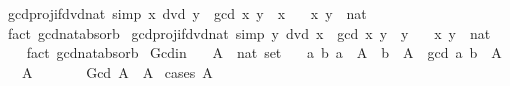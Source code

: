 \begin{isabellebody}
\isanewline
%
\endisadelimproof
\isanewline
{}\isamarkupfalse%
\ gcd{\isacharunderscore}{\kern0pt}proj{}{\isacharunderscore}{\kern0pt}if{\isacharunderscore}{\kern0pt}dvd{\isacharunderscore}{\kern0pt}nat\ {\isacharbrackleft}{\kern0pt}simp{\isacharbrackright}{\kern0pt}{\isacharcolon}{\kern0pt}\ {\isachardoublequoteopen}x\ dvd\ y\ {\isasymLongrightarrow}\ gcd\ x\ y\ {\isacharequal}{\kern0pt}\ x{\isachardoublequoteclose}\isanewline
\ \ \ x\ y\ {\isacharcolon}{\kern0pt}{\isacharcolon}{\kern0pt}\ nat\isanewline
%
\isadelimproof
\ \ %
\endisadelimproof
%
\isatagproof
{}\isamarkupfalse%
\ {\isacharparenleft}{\kern0pt}fact\ gcd{\isacharunderscore}{\kern0pt}nat{\isachardot}{\kern0pt}absorb{}{\isacharparenright}{\kern0pt}%
\endisatagproof
{\isafoldproof}%
%
\isadelimproof
\isanewline
%
\endisadelimproof
\isanewline
{}\isamarkupfalse%
\ gcd{\isacharunderscore}{\kern0pt}proj{}{\isacharunderscore}{\kern0pt}if{\isacharunderscore}{\kern0pt}dvd{\isacharunderscore}{\kern0pt}nat\ {\isacharbrackleft}{\kern0pt}simp{\isacharbrackright}{\kern0pt}{\isacharcolon}{\kern0pt}\ {\isachardoublequoteopen}y\ dvd\ x\ {\isasymLongrightarrow}\ gcd\ x\ y\ {\isacharequal}{\kern0pt}\ y{\isachardoublequoteclose}\isanewline
\ \ \ x\ y\ {\isacharcolon}{\kern0pt}{\isacharcolon}{\kern0pt}\ nat\isanewline
%
\isadelimproof
\ \ %
\endisadelimproof
%
\isatagproof
{}\isamarkupfalse%
\ {\isacharparenleft}{\kern0pt}fact\ gcd{\isacharunderscore}{\kern0pt}nat{\isachardot}{\kern0pt}absorb{}{\isacharparenright}{\kern0pt}%
\endisatagproof
{\isafoldproof}%
%
\isadelimproof
\isanewline
%
\endisadelimproof
\isanewline
{}\isamarkupfalse%
\ Gcd{\isacharunderscore}{\kern0pt}in{\isacharcolon}{\kern0pt}\isanewline
\ \ \ A\ {\isacharcolon}{\kern0pt}{\isacharcolon}{\kern0pt}\ {\isachardoublequoteopen}nat\ set{\isachardoublequoteclose}\isanewline
\ \ \ {\isachardoublequoteopen}{\isasymAnd}a\ b{\isachardot}{\kern0pt}\ a\ {\isasymin}\ A\ {\isasymLongrightarrow}\ b\ {\isasymin}\ A\ {\isasymLongrightarrow}\ gcd\ a\ b\ {\isasymin}\ A{\isachardoublequoteclose}\isanewline
\ \ \ {\isachardoublequoteopen}A\ {\isasymnoteq}\ {\isacharbraceleft}{\kern0pt}{\isacharbraceright}{\kern0pt}{\isachardoublequoteclose}\isanewline
\ \ \ \ \ {\isachardoublequoteopen}Gcd\ A\ {\isasymin}\ A{\isachardoublequoteclose}\isanewline
%
\isadelimproof
%
\endisadelimproof
%
\isatagproof
{}\isamarkupfalse%
\ {\isacharparenleft}{\kern0pt}cases\ {\isachardoublequoteopen}A\ {\isacharequal}{\kern0pt}\ {\isacharbraceleft}{\kern0pt}{}{\isacharbraceright}{\kern0pt}{\isachardoublequoteclose}{\isacharparenright}{\kern0pt}\isanewline

\end{isabellebody}

